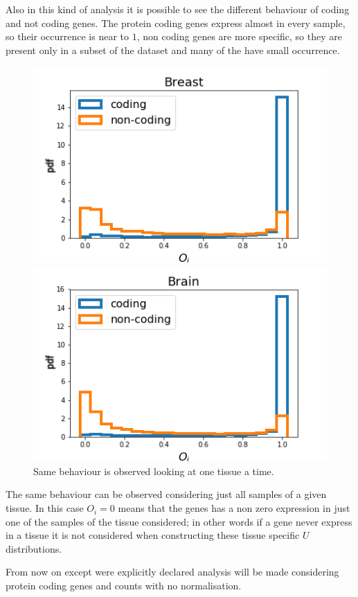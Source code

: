 Also in this kind of analysis it is possible to see the different behaviour of coding and not coding genes. The protein coding genes express almost in every sample, so their occurrence is near to $1$, non coding genes are more specific, so they are present only in a subset of the dataset and many of the have small occurrence.
\begin{figure}[htb!]
    \centering
    \begin{minipage}{0.45\textwidth}
    \includegraphics[width=0.95\linewidth]{pictures/structure/gtex/U_Breast.png}
    \end{minipage}
    \hspace{2mm}
    \begin{minipage}{0.45\textwidth}
    \includegraphics[width=0.95\linewidth]{pictures/structure/gtex/U_Brain.png}
    \end{minipage}
    \caption{Same behaviour is observed looking at one tissue a time.}
    \label{fig:structure/gtex/U_tissues}
\end{figure}
The same behaviour can be observed considering just all samples of a given tissue. In this case $O_i=0$ means that the genes has a non zero expression in just one of the samples of the tissue considered; in other words if a gene never express in a tissue it is not considered when constructing these tissue specific $U$ distributions.

From now on except were explicitly declared analysis will be made considering protein coding genes and counts with no normalisation.
